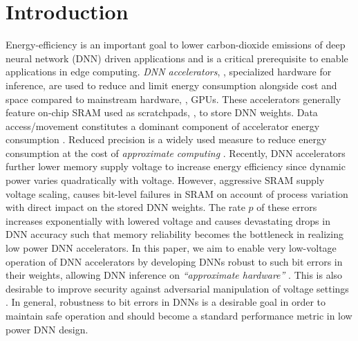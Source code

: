 \section{Introduction}

Energy-efficiency is an important goal to lower carbon-dioxide emissions of deep neural network (DNN) driven applications and is a critical prerequisite to enable applications in edge computing.
\emph{DNN accelerators}, \ie, specialized hardware for inference, are used to reduce and limit energy consumption alongside cost and space compared to mainstream hardware, \eg, GPUs.
These accelerators generally feature on-chip SRAM used as scratchpads, \eg, to store DNN weights. Data access/movement
constitutes a dominant component of accelerator energy consumption \cite{SzeIEEE2017}.
Reduced precision \cite{LinICML2016} is a widely used measure to reduce energy consumption at the cost of \emph{approximate computing} \cite{SampsonPLDI2011}.
Recently, DNN accelerators \cite{ReagenISCA2016, KimDATE2018,ChandramoorthyHPCA2019} further lower memory supply voltage to increase energy efficiency since dynamic power varies quadratically with voltage. However, aggressive SRAM supply voltage scaling, causes bit-level failures in SRAM on account of process variation \cite{GanapathyDAC2017,GuoJSSC2009} with direct impact on the stored DNN weights. The rate $p$ of these errors increases exponentially with lowered voltage
and causes devastating drops in DNN accuracy such that memory reliability becomes the bottleneck in realizing low power DNN accelerators. In this paper, we aim to enable very low-voltage operation of DNN accelerators by developing DNNs robust to such bit errors in their weights, allowing DNN inference on \emph{``approximate hardware''} \cite{KoppulaMICRO2019,SampsonPLDI2011}. This is also desirable to improve security against adversarial
manipulation of voltage settings \cite{TangUSENIX2017}. 
In general, robustness to bit errors in DNNs is a desirable goal in order to maintain safe operation and should become a standard performance metric in low power DNN design.

